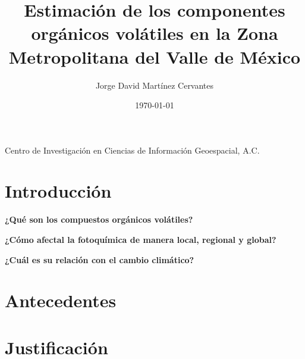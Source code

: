 \documentclass[10pt]{article}
\title{\renewcommand{\baselinestretch}{1.17}\bf%
Estimación de los componentes orgánicos volátiles en la Zona Metropolitana del Valle de México
}
\author{%
Jorge David Martínez Cervantes
}
\begin{document}
\date{\today}

\maketitle

\vspace{-0.5cm}

\begin{center}
{\footnotesize 
Centro de Investigación en Ciencias de Información Geoespacial, A.C. \\
}
\end{center}


\section{Introducción}\label{sec:1}

\bf{¿Qué son los compuestos orgánicos volátiles?}

\bf{¿Cómo afectal la fotoquímica de manera local, regional y global?}

\bf{¿Cuál es su relación con el cambio climático?}

\section{Antecedentes}\label{sec:2}


\section{Justificación}\label{sec:3}
\end{document}
